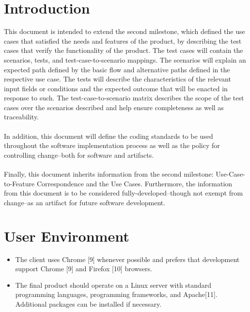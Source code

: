 \documentclass{article}
\begin{document}
\section{Introduction}
This document is intended to extend the second milestone, which defined the use cases that satisfied the needs and features of the product, by describing the test cases that verify the functionality of the product.  The test cases will contain the scenarios, tests, and test-case-to-scenario mappings.  The scenarios will explain an expected path defined by the basic flow and alternative paths defined in the respective use case.  The tests will describe the characteristics of the relevant input fields or conditions and the expected outcome that will be enacted in response to such.  The test-case-to-scenario matrix describes the scope of the test cases over the scenarios described and help ensure completeness as well as traceability.\\
~\\
In addition, this document will define the coding standards to be used throughout the software implementation process as well as the policy for controlling change--both for software and artifacts.\\
~\\
Finally, this document inherits information from the second milestone:  Use-Case-to-Feature Correspondence and the Use Cases.  Furthermore, the information from this document is to be considered fully-developed--though not exempt from change--as an artifact for future software development.

\section{User Environment}
\begin{itemize}
\item The client uses Chrome [9] whenever possible and prefers that development support Chrome [9] and Firefox [10] browsers.
\item The final product should operate on a Linux server with standard programming languages, programming frameworks, and Apache[11].  Additional packages can be installed if necessary.
\end{itemize}
\end{document}
